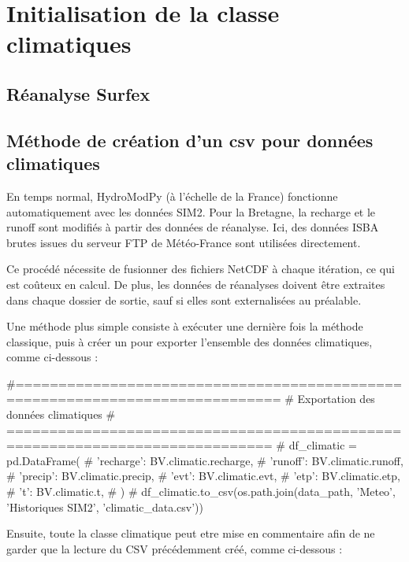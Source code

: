 \section{Initialisation de la classe climatiques}
\label{sec:initialisation_climatiques}

\subsection{Réanalyse Surfex}
\label{sec:reanalyse_surfex}

\subsection{Méthode de création d'un csv pour données climatiques}
\label{sec:csv_donnees_climatiques}

En temps normal, HydroModPy (à l’échelle de la France) fonctionne automatiquement avec les données SIM2. Pour la Bretagne, la recharge et le runoff sont modifiés à partir des données de réanalyse. Ici, des données ISBA brutes issues du serveur FTP de Météo-France sont utilisées directement.

Ce procédé nécessite de fusionner des fichiers NetCDF à chaque itération, ce qui est coûteux en calcul. De plus, les données de réanalyses doivent être extraites dans chaque dossier de sortie, sauf si elles sont externalisées au préalable.

Une méthode plus simple consiste à exécuter une dernière fois la méthode classique, puis à créer un  pour exporter l’ensemble des données climatiques, comme ci-dessous :

\begin{pythoncode}[]
#============================================================================= 
# Exportation des données climatiques 
# ============================================================================= 
# df_climatic = pd.DataFrame({
#     'recharge': BV.climatic.recharge,
#     'runoff': BV.climatic.runoff,
#     'precip': BV.climatic.precip,
#     'evt': BV.climatic.evt,
#     'etp': BV.climatic.etp,
#     't': BV.climatic.t,
# })
# df_climatic.to_csv(os.path.join(data_path, 'Meteo', 'Historiques SIM2', 'climatic_data.csv'))
\end{pythoncode}

Ensuite, toute la classe climatique peut etre mise en commentaire afin de ne garder que la lecture du CSV précédemment créé, comme ci-dessous :

